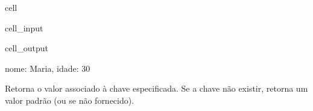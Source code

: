 \documentclass[letterpaper,10pt,english]{jupyterBook}
\begin{document}
\begin{sphinxuseclass}{cell}\begin{sphinxVerbatimInput}

\begin{sphinxuseclass}{cell_input}
\begin{sphinxVerbatim}[commandchars=\\\{\}]
     
  
\end{sphinxVerbatim}

\end{sphinxuseclass}\end{sphinxVerbatimInput}
\begin{sphinxVerbatimOutput}

\begin{sphinxuseclass}{cell_output}
\begin{sphinxVerbatim}[commandchars=\\\{\}]
\PYGZob{}\PYGZsq{}nome\PYGZsq{}: \PYGZsq{}Maria\PYGZsq{}, \PYGZsq{}idade\PYGZsq{}: 30\PYGZcb{}
\end{sphinxVerbatim}

\end{sphinxuseclass}\end{sphinxVerbatimOutput}

\end{sphinxuseclass}
\sphinxAtStartPar
{}
Retorna o valor associado à chave especificada. Se a chave não existir, retorna um valor padrão (ou  se não fornecido).
\end{document}
